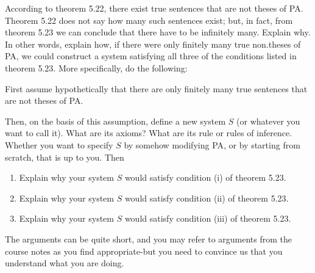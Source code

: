 \begin{problem}
  According to theorem 5.22, there exist true sentences that are not theses of PA. Theorem 5.22 does not say how many such sentences exist; but, in fact, from theorem 5.23 we can conclude that there have to be infinitely many. Explain why. In other words, explain how, if there were only finitely many true non.theses of PA, we could construct a system satisfying all three of the conditions listed in theorem 5.23. More specifically, do the following:

  First assume hypothetically that there are only finitely many true sentences that are not theses of PA.

  Then, on the basis of this assumption, define a new system $S$ (or whatever you want to call it). What are its axioms? What are its rule or rules of inference. Whether you want to specify $S$ by somehow modifying PA, or by starting from scratch, that is up to you.
  Then
\begin{enumerate}[font=\normalfont,label=\textbf{(\Alph*)}, wide]
  \item Explain why your system $S$ would satisfy condition (i) of theorem 5.23.


  \item Explain why your system $S$ would satisfy condition (ii) of theorem 5.23.


  \item Explain why your system $S$ would satisfy condition (iii) of theorem 5.23.
\end{enumerate}
  The arguments can be quite short, and you may refer to arguments from the course notes as you find appropriate-but you need to convince us that you understand what you are doing.

\end{problem}
